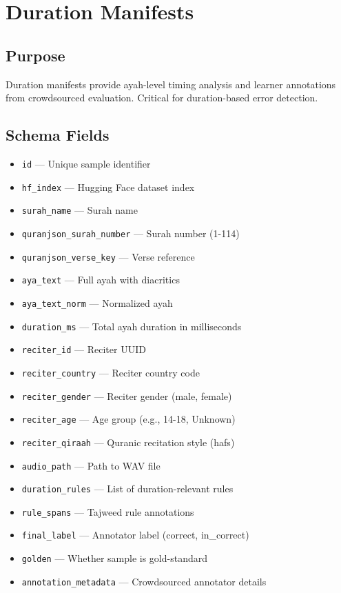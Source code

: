 \newpage

\section{Duration Manifests}

\subsection{Purpose}
Duration manifests provide ayah-level timing analysis and learner annotations from crowdsourced evaluation. Critical for duration-based error detection.

\subsection{Schema Fields}

\begin{itemize}
  \item \texttt{id} — Unique sample identifier
  \item \texttt{hf\_index} — Hugging Face dataset index
  \item \texttt{surah\_name} — Surah name
  \item \texttt{quranjson\_surah\_number} — Surah number (1-114)
  \item \texttt{quranjson\_verse\_key} — Verse reference
  \item \texttt{aya\_text} — Full ayah with diacritics
  \item \texttt{aya\_text\_norm} — Normalized ayah
  \item \texttt{duration\_ms} — Total ayah duration in milliseconds
  \item \texttt{reciter\_id} — Reciter UUID
  \item \texttt{reciter\_country} — Reciter country code
  \item \texttt{reciter\_gender} — Reciter gender (male, female)
  \item \texttt{reciter\_age} — Age group (e.g., 14-18, Unknown)
  \item \texttt{reciter\_qiraah} — Quranic recitation style (hafs)
  \item \texttt{audio\_path} — Path to WAV file
  \item \texttt{duration\_rules} — List of duration-relevant rules
  \item \texttt{rule\_spans} — Tajweed rule annotations
  \item \texttt{final\_label} — Annotator label (correct, in\_correct)
  \item \texttt{golden} — Whether sample is gold-standard
  \item \texttt{annotation\_metadata} — Crowdsourced annotator details
\end{itemize}

